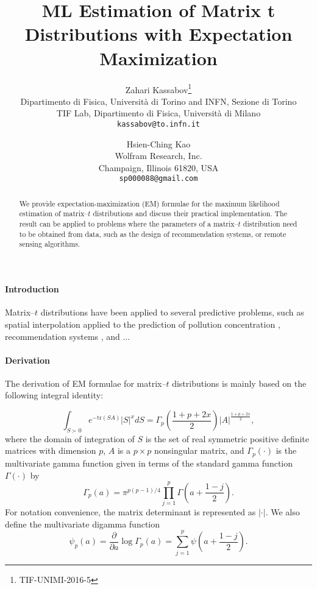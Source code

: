 \documentclass[english,listof=totoc]{scrartcl}
\title{ML Estimation of Matrix t Distributions with Expectation Maximization}
\author{Zahari Kassabov\thanks{TIF-UNIMI-2016-5}\\
        Dipartimento di Fisica, Universit\`a di Torino and INFN, Sezione di Torino\\
		TIF Lab, Dipartimento di Fisica, Universit\`a di Milano\\
        \texttt{kassabov@to.infn.it}\\
        \and
        Hsien-Ching Kao\\
        Wolfram Research, Inc.\\
		Champaign, Illinois 61820, USA\\
		\texttt{sp000088@gmail.com}
		}
\begin{document}
\maketitle

\begin{abstract}
We provide expectation-maximization (EM) formulae for the maximum
likelihood estimation of matrix--$t$ distributions and discuss their
practical implementation.  The result can be applied to problems where
the parameters of a matrix--$t$ distribution need to be obtained from
data, such as the design of recommendation systems, or remote sensing
algorithms.
\end{abstract}

\paragraph{Introduction}
Matrix--$t$ distributions have been applied to several predictive
problems, such as spatial interpolation applied to the prediction of
pollution concentration \citep{KIBRIA2006785}, recommendation systems
\citep{NIPS2007_3203}, and ...

\paragraph{Derivation}

The derivation of EM formulae for matrix--$t$ distributions is mainly based on the following integral identity:

\begin{equation}
\int_{S\succ 0}e^{-\textrm{tr}(SA)}|S|^{x}dS=\Gamma_{p}\left(\frac{1+p+2x}{2}\right)|A|^{\frac{1+p+2x}{2}},\label{eq:intmultgammadef}
\end{equation}
where the domain of integration of $S$ is the set of real symmetric positive definite
matrices with dimension $p$, $A$ is a $p\times p$ nonsingular matrix, and $\Gamma_{p}(\cdot)$ is the multivariate gamma function given in terms of the standard gamma function $\Gamma(\cdot)$ by
\begin{equation}
\Gamma_{p}(a)=\pi^{p(p-1)/4}\prod_{j=1}^{p}\Gamma\left(a+\frac{1-j}{2}\right).\label{eq:multgammadef}
\end{equation}
For notation convenience, the matrix determinant is represented as $|\cdot|$. We also define the multivariate digamma function
\begin{equation}
\psi_{p}(a)=\frac{\partial}{\partial a}\log\Gamma_{p}(a)=\sum_{j=1}^{p}\psi\left(a+\frac{1-j}{2}\right).
\end{equation}
\end{document}
